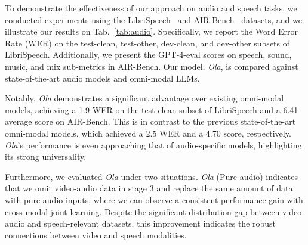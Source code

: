 \begin{table}[t]
  \centering
  \caption{\textbf{Analysis on Progressive Modality Learning.} We evaluate the basic performance on image and video understanding for the intermediate models during the training stage. The highlighted row indicates the final accepted strategy.}
  \label{tab:training}%
\end{table}%



To demonstrate the effectiveness of our approach on audio and speech tasks, we conducted experiments using the LibriSpeech~\citep{panayotov2015librispeech} and AIR-Bench~\citep{yang2024airbench} datasets, and we illustrate our results on Tab.~\ref{tab:audio}. Specifically, we report the Word Error Rate (WER) on the test-clean, test-other, dev-clean, and dev-other subsets of LibriSpeech.   Additionally, we present the GPT-4-eval scores on speech, sound, music, and mix sub-metrics in AIR-Bench.   Our model, \textit{Ola}, is compared against state-of-the-art audio models and omni-modal LLMs.

Notably, \textit{Ola} demonstrates a significant advantage over existing omni-modal models, achieving a 1.9 WER on the test-clean subset of LibriSpeech and a 6.41 average score on AIR-Bench. This is in contrast to the previous state-of-the-art omni-modal models, which achieved a 2.5 WER and a 4.70 score, respectively. \textit{Ola}'s performance is even approaching that of audio-specific models, highlighting its strong universality. 

Furthermore, we evaluated \textit{Ola} under two situations. \textit{Ola} (Pure audio) indicates that we omit video-audio data in stage 3 and replace the same amount of data with pure audio inputs, where we can observe a consistent performance gain with cross-modal joint learning. Despite the significant distribution gap between video audio and speech-relevant datasets, this improvement indicates the robust connections between video and speech modalities.


